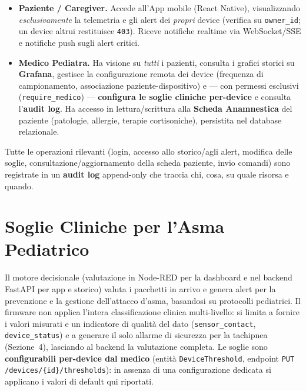 \documentclass[11pt,a4paper]{article}
\begin{document}
\begin{itemize}[leftmargin=1.3em,itemsep=2pt]
  \item \textbf{Paziente / Caregiver.} Accede all'App mobile (React Native), visualizzando \emph{esclusivamente} la telemetria e gli alert dei \emph{propri} device (verifica su \texttt{owner\_id}; un device altrui restituisce \texttt{403}). Riceve notifiche realtime via WebSocket/SSE e notifiche push sugli alert critici.
  \item \textbf{Medico Pediatra.} Ha visione su \emph{tutti} i pazienti, consulta i grafici storici su \textbf{Grafana}, gestisce la configurazione remota dei device (frequenza di campionamento, associazione paziente-dispositivo) e --- con permessi esclusivi (\texttt{require\_medico}) --- \textbf{configura le soglie cliniche per-device} e consulta l'\textbf{audit log}. Ha accesso in lettura/scrittura alla \textbf{Scheda Anamnestica} del paziente (patologie, allergie, terapie cortisoniche), persistita nel database relazionale.
\end{itemize}

Tutte le operazioni rilevanti (login, accesso allo storico/agli alert, modifica delle soglie, consultazione/aggiornamento della scheda paziente, invio comandi) sono registrate in un \textbf{audit log} append-only che traccia chi, cosa, su quale risorsa e quando.

\newpage
\section{Soglie Cliniche per l'Asma Pediatrico}

Il motore decisionale (valutazione in Node-RED per la dashboard e nel backend FastAPI per app e storico) valuta i pacchetti in arrivo e genera alert per la prevenzione e la gestione dell'attacco d'asma, basandosi su protocolli pediatrici. Il firmware non applica l'intera classificazione clinica multi-livello: si limita a fornire i valori misurati e un indicatore di qualità del dato (\texttt{sensor\_contact}, \texttt{device\_status}) e a generare il solo allarme di sicurezza per la tachipnea (Sezione~4), lasciando al backend la valutazione completa. Le soglie sono \textbf{configurabili per-device dal medico} (entità \texttt{DeviceThreshold}, endpoint \texttt{PUT /devices/\{id\}/thresholds}): in assenza di una configurazione dedicata si applicano i valori di default qui riportati.
\end{document}
